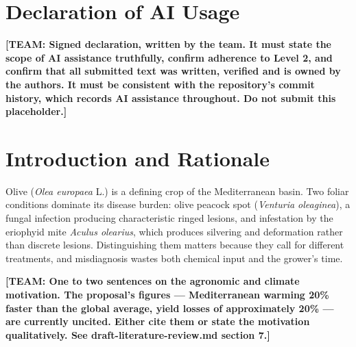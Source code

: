 \documentclass[sigconf,nonacm]{acmart}
\newcommand{\NEEDSTEAM}[1]{\textbf{[TEAM: #1]}}
\begin{document}
\maketitle

%
\section*{Declaration of AI Usage}
\NEEDSTEAM{Signed declaration, written by the team. It must state the scope of AI
assistance truthfully, confirm adherence to Level 2, and confirm that all
submitted text was written, verified and is owned by the authors. It must be
consistent with the repository's commit history, which records AI assistance
throughout. Do not submit this placeholder.}

\section{Introduction and Rationale}

Olive (\emph{Olea europaea} L.) is a defining crop of the Mediterranean basin.
Two foliar conditions dominate its disease burden: olive peacock spot
(\emph{Venturia oleaginea}), a fungal infection producing characteristic ringed
lesions, and infestation by the eriophyid mite \emph{Aculus olearius}, which
produces silvering and deformation rather than discrete lesions. Distinguishing
them matters because they call for different treatments, and misdiagnosis wastes
both chemical input and the grower's time.

\NEEDSTEAM{One to two sentences on the agronomic and climate motivation. The
proposal's figures --- Mediterranean warming 20\% faster than the global average,
yield losses of approximately 20\% --- are currently uncited. Either cite them or
state the motivation qualitatively. See draft-literature-review.md section 7.}
\end{document}
